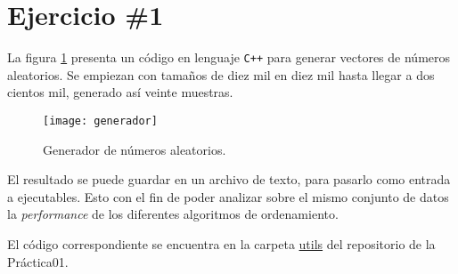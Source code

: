 \section*{Ejercicio \#1}
La figura \ref{fig:generador} presenta un código en lenguaje \verb!C++! para generar vectores de números aleatorios. Se empiezan con tamaños de diez mil en diez mil hasta llegar a dos cientos mil, generado así veinte muestras.
\begin{figure}[H]
  \centering
  \texttt{[image: generador]}
  \caption{Generador de números aleatorios.}
  \label{fig:generador}
\end{figure}

El resultado se puede guardar en un archivo de texto, para pasarlo como entrada a ejecutables. Esto con el fin de poder analizar sobre el mismo conjunto de datos la \textit{performance} de los diferentes algoritmos de ordenamiento.

El código correspondiente se encuentra en la carpeta \href{https://github.com/syordya/CSUNSA-EDA/tree/master/Practica01/utils}{utils} del repositorio de la Práctica01.

\iffalse
Como se muestra en la figuras \ref{fig:act-1_a} y \ref{fig:act-1_b}.
\begin{figure}[H]
\centering
\begin{minipage}{0.45\textwidth}
  \centering
  \texttt{[image: act-1\_a]}
  \caption{Envío de \textit{ICMP ECHO REQUEST} de PC0 a PC1, PC2 y PC3.}
  \label{fig:act-1_a}
\end{minipage}\hfill
\begin{minipage}{0.45\textwidth}
  \centering
  \texttt{[image: act-1\_b]}
  \caption{Respuesta de PC1, PC2 y PC3. Tabla ARP de PC0.}
  \label{fig:act-1_b}
\end{minipage}
\end{figure}
Como se muestra en la figura \ref{fig:act-3}
\begin{figure}[H]
  \centering
  \texttt{[image: act-3]}
  \caption{Tabla de subneteo para la red 192.168.100.0.}
  \label{fig:act-3}
\end{figure}
\fi